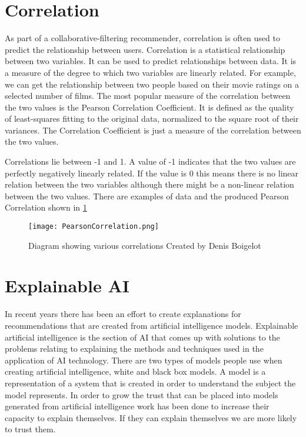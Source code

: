         

    \section{Correlation}\label{sec:pearsonCorrelation}
        As part of a collaborative-filtering recommender, correlation is often used to predict the relationship between users. Correlation is a statistical relationship between two variables. It can be used to predict relationships between data. It is a measure of the degree to which two variables are linearly related. For example, we can get the relationship between two people based on their movie ratings on a selected number of films. The most popular measure of the correlation between the two values is the Pearson Correlation Coefficient. It is defined as the quality of least-squares fitting to the original data, normalized to the square root of their variances. The Correlation Coefficient is just a measure of the correlation between the two values.  

        Correlations lie between -1 and 1. A value of -1 indicates that the two values are perfectly negatively linearly related. If the value is 0 this means there is no linear relation between the two variables although there might be a non-linear relation between the two values. There are examples of data and the produced Pearson Correlation shown in \ref{fig:PearsonCorrelationPic}

        \begin{figure}
            \texttt{[image: PearsonCorrelation.png]}
            \label{fig:PearsonCorrelationPic}
            \caption{Diagram showing various correlations Created by Denis Boigelot}
            \cite{PearsonCorrelationImage}
        \end{figure}

    

    \section{Explainable AI}
        In recent years there has been an effort to create explanations for recommendations that are created from artificial intelligence models. Explainable artificial intelligence is the section of AI that comes up with solutions to the problems relating to explaining the methods and techniques used in the application of AI technology. There are two types of models people use when creating artificial intelligence, white and black box models.  A model is a representation of a system that is created in order to understand the subject the model represents. In order to grow the trust that can be placed into models generated from artificial intelligence work has been done to increase their capacity to explain themselves. If they can explain themselves we are more likely to trust them. 

